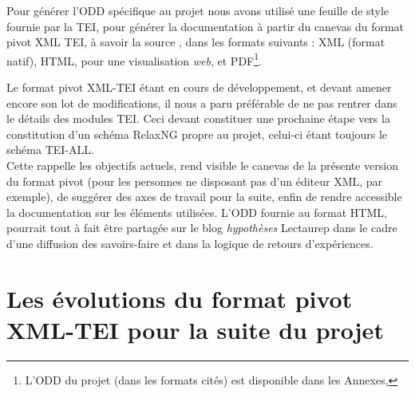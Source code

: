 Pour générer l'ODD spécifique au projet nous avons utilisé une feuille de style  fournie par la TEI, pour générer la documentation à partir du canevas du format pivot XML TEI, à savoir la source , dans les formats suivants : XML (format natif), HTML, pour une visualisation \textit{web}, et PDF\footnote{L'ODD du projet (dans les formats cités) est disponible dans les Annexes, }.

Le format pivot XML-TEI étant en cours de développement, et devant amener encore son lot de modifications, il nous a paru préférable de ne pas rentrer dans le détails des modules TEI. Ceci devant constituer une prochaine étape vers la constitution d'un schéma RelaxNG propre au projet, celui-ci étant toujours le schéma TEI-ALL.\\ 

Cette  rappelle les objectifs actuels, rend visible le canevas de la présente version du format pivot (pour les personnes ne disposant pas d'un éditeur XML, par exemple), de suggérer des axes de travail pour la suite, enfin de rendre accessible la documentation sur les éléments utilisées. L'ODD fournie au format HTML, pourrait tout à fait être partagée sur le blog \textit{hypothèses} Lectaurep dans le cadre d'une diffusion des savoirs-faire et dans la logique de retours d'expériences.

\section{Les évolutions du format pivot XML-TEI pour la suite du projet}

